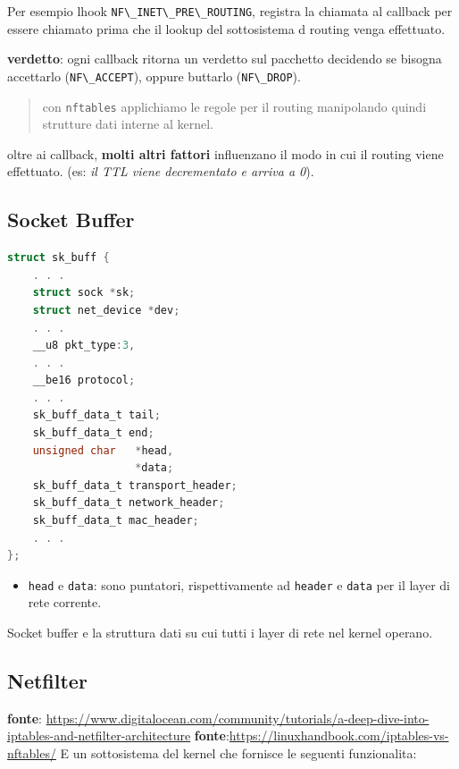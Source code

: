 Per esempio l\textquotesingle hook
\passthrough{\lstinline!NF\_INET\_PRE\_ROUTING!}, registra la chiamata
al callback per essere chiamato prima che il lookup del sottosistema d
routing venga effettuato.

\textbf{verdetto}: ogni callback ritorna un verdetto sul pacchetto
decidendo se bisogna accettarlo (\passthrough{\lstinline!NF\_ACCEPT!}),
oppure buttarlo (\passthrough{\lstinline!NF\_DROP!}).

\begin{quote}
con \passthrough{\lstinline!nftables!} applichiamo le regole per il
routing manipolando quindi strutture dati interne al kernel.
\end{quote}

oltre ai callback, \textbf{molti altri fattori} influenzano il modo in
cui il routing viene effettuato. (es: \emph{il TTL viene decrementato e
arriva a 0}).

\subsection{Socket Buffer}\label{socket-buffer}

\begin{lstlisting}[language=C]
struct sk_buff {
    . . .
    struct sock *sk;
    struct net_device *dev;
    . . .
    __u8 pkt_type:3,
    . . .
    __be16 protocol;
    . . .
    sk_buff_data_t tail;
    sk_buff_data_t end;
    unsigned char   *head,
                    *data;
    sk_buff_data_t transport_header;
    sk_buff_data_t network_header;
    sk_buff_data_t mac_header;
    . . .
};
\end{lstlisting}

\begin{itemize}
\tightlist
\item
  \passthrough{\lstinline!head!} e \passthrough{\lstinline!data!}: sono
  puntatori, rispettivamente ad \passthrough{\lstinline!header!} e
  \passthrough{\lstinline!data!} per il layer di rete corrente.
\end{itemize}

Socket buffer e\textquotesingle{} la struttura dati su cui tutti i layer
di rete nel kernel operano.

\subsection{Netfilter}\label{netfilter}

\textbf{fonte}:
\url{https://www.digitalocean.com/community/tutorials/a-deep-dive-into-iptables-and-netfilter-architecture}
\textbf{fonte}:\url{https://linuxhandbook.com/iptables-vs-nftables/}
E\textquotesingle{} un sottosistema del kernel che fornisce le seguenti
funzionalita:

